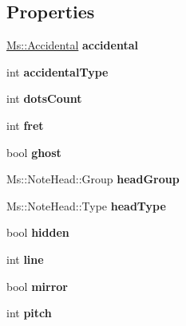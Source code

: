 \subsection*{Properties}
\begin{DoxyCompactItemize}
\item 
\mbox{\label{class_ms_1_1_note_acc6c5ba99c3540955e9ea15c0d522a3c}} 
\hyperlink{class_ms_1_1_accidental}{Ms\+::\+Accidental} {\bfseries accidental}
\item 
\mbox{\label{class_ms_1_1_note_a78ee3691339d53533b08114b4a7da756}} 
int {\bfseries accidental\+Type}
\item 
\mbox{\label{class_ms_1_1_note_a86704018ad54fb117e1bb3ca5d9a0f01}} 
int {\bfseries dots\+Count}
\item 
\mbox{\label{class_ms_1_1_note_a5569faef573958506775c45f2a294399}} 
int {\bfseries fret}
\item 
\mbox{\label{class_ms_1_1_note_aa5bf76586a2f9941190588846de7b49f}} 
bool {\bfseries ghost}
\item 
\mbox{\label{class_ms_1_1_note_a1a3eca9201779580ade3ff664d4582e6}} 
Ms\+::\+Note\+Head\+::\+Group {\bfseries head\+Group}
\item 
\mbox{\label{class_ms_1_1_note_affef167b10dea4867e0a4799526c225a}} 
Ms\+::\+Note\+Head\+::\+Type {\bfseries head\+Type}
\item 
\mbox{\label{class_ms_1_1_note_afd4863682dbc7e44282bb9e6cc9403cb}} 
bool {\bfseries hidden}
\item 
\mbox{\label{class_ms_1_1_note_a42e750c7c9ece9b3fdd27c758251e695}} 
int {\bfseries line}
\item 
\mbox{\label{class_ms_1_1_note_a3945be01252f57c80c8484d563341621}} 
bool {\bfseries mirror}
\item 
\mbox{\label{class_ms_1_1_note_acb1ec5ae83ae9ac4a3f31a0a3222df28}} 
int {\bfseries pitch}

\end{DoxyCompactItemize}
